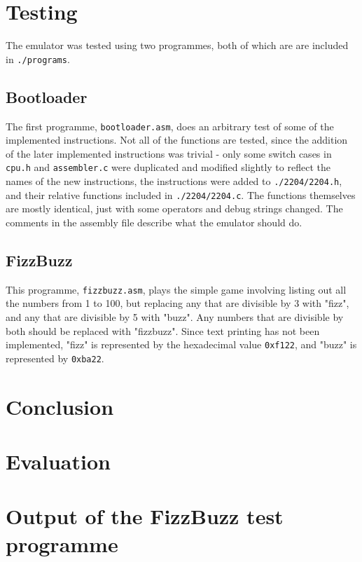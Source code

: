 \documentclass[a4paper,11pt]{article}
\begin{document}
\section{Testing}
    The emulator was tested using two programmes, both of which are are included in \lstinline{./programs}.
    
    \subsection{Bootloader}
        The first programme, \lstinline{bootloader.asm}, does an arbitrary test of some of the implemented instructions. Not all of the functions are tested, since the addition of the later implemented instructions was trivial - only some switch cases in \lstinline{cpu.h} and \lstinline{assembler.c} were duplicated and modified slightly to reflect the names of the new instructions, the instructions were added to \lstinline{./2204/2204.h}, and their relative functions included in \lstinline{./2204/2204.c}. The functions themselves are mostly identical, just with some operators and debug strings changed. The comments in the assembly file describe what the emulator should do.
    
    \subsection{FizzBuzz}
        This programme, \lstinline{fizzbuzz.asm}, plays the simple game involving listing out all the numbers from 1 to 100, but replacing any that are divisible by 3 with "fizz", and any that are divisible by 5 with "buzz". Any numbers that are divisible by both should be replaced with "fizzbuzz". Since text printing has not been implemented, "fizz" is represented by the hexadecimal value \lstinline{0xf122}, and "buzz" is represented by \lstinline{0xba22}.

\section{Conclusion}
    

\section{Evaluation}

\begin{appendices}
    \label{appendix}
    \section{Output of the FizzBuzz test programme}
    \label{dat:fizzbuzz}
\end{appendices}



\end{document}
